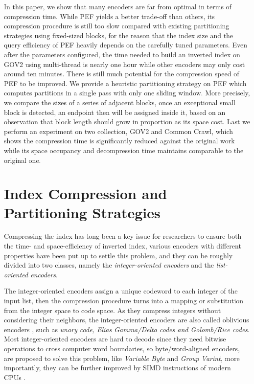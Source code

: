 \documentclass[runningheads]{comsis2}
\begin{document}
In this paper, we show that many encoders are far from optimal in terms of compression time.
While PEF yields a better trade-off than others, its compression procedure is still too slow compared with existing partitioning strategies using fixed-sized blocks, for the reason that the index size and the query efficiency of PEF heavily depends on the carefully tuned parameters.
Even after the parameters configured, the time needed to build an inverted index on GOV2 using multi-thread is nearly one hour while other encoders may only cost around ten minutes.
There is still much potential for the compression speed of PEF to be improved.
We provide a heuristic partitioning strategy on PEF which computes partitions in a single pass with only one sliding window.
More precisely, we compare the sizes of a series of adjacent blocks, once an exceptional small block is detected, an endpoint then will be assigned inside it, based on an observation that block length should grow in proportion as its space cost.
Last we perform an experiment on two collection, GOV2 and Common Crawl, which shows the compression time is significantly reduced against the original work while its space occupancy and decompression time maintains comparable to the original one.
\section{Index Compression and Partitioning Strategies}\label{sec:background}

Compressing the index has long been a key issue for researchers to ensure both the time- and space-efficiency of inverted index, various encoders with different properties have been put up to settle this problem, and they can be roughly divided into two classes, namely the \textit{integer-oriented encoders} and the \textit{list-oriented encoders}.

The integer-oriented encoders assign a unique codeword to each integer of the input list, then the compression procedure turns into a mapping or substitution from the integer space to code space.
As they compress integers without considering their neighbors, the integer-oriented encoders are also called oblivious encoders \cite{catena2014inverted}, such as \textit{unary code, Elias Gamma/Delta codes \emph{and} Golomb/Rice codes}.
Most integer-oriented encoders are hard to decode since they need bitwise operations to cross computer word boundaries, so byte/word-aligned encoders, are proposed to solve this problem, like \textit{Variable Byte} and \textit{Group Varint}, more importantly, they can be further improved by SIMD instructions of modern CPUs \cite{stepanov2011simd,trotman2014compression}.
\end{document}
